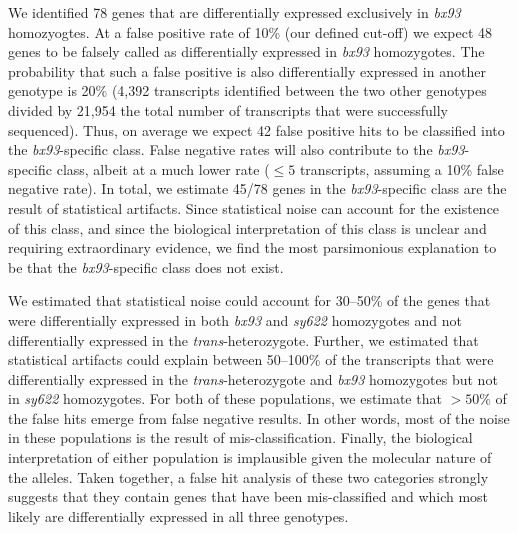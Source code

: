 \documentclass[10pt, twocolumn]{article}
\begin{document}
We identified 78 genes that are differentially expressed
exclusively in \emph{bx93} homozyogtes. At a false positive rate of 10\% (our
defined cut-off) we expect 48 genes to be falsely called as differentially
expressed in \emph{bx93} homozygotes. The probability that such a false positive
is also differentially expressed in another genotype is 20\% (4,392 transcripts
identified between the two other genotypes divided by 21,954 the total number of
transcripts that were successfully sequenced). Thus, on average we expect 42
false positive hits to be classified into the \emph{bx93}-specific class. False
negative rates will also contribute to the \emph{bx93}-specific class, albeit at
a much lower rate ($\leq 5$ transcripts, assuming a 10\% false negative rate).
In total, we estimate 45/78 genes in the \emph{bx93}-specific class are the
result of statistical artifacts. Since statistical noise can account for the
existence of this class, and since the biological interpretation of this class
is unclear and requiring extraordinary evidence, we find the most parsimonious
explanation to be that the \emph{bx93}-specific class does not exist.



We estimated that statistical noise could account for 30--50\%
of the genes that were differentially expressed in both \emph{bx93} and
\emph{sy622} homozygotes and not differentially expressed in the
\emph{trans}-heterozygote. Further, we estimated that statistical artifacts
could explain between 50--100\% of the transcripts that were differentially
expressed in the \emph{trans}-heterozygote and \emph{bx93} homozygotes but not
in \emph{sy622} homozygotes. For both of these populations, we estimate that
$>50\%$ of the false hits emerge from false negative results. In other words,
most of the noise in these populations is the result of mis-classification.
Finally, the biological interpretation of either population is implausible given
the molecular nature of the alleles. Taken together, a false hit analysis of
these two categories strongly suggests that they contain genes that have been
mis-classified and which most likely are differentially expressed in all three
genotypes.
\end{document}
